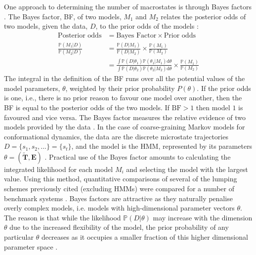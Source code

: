 One approach to determining the number of macrostates is through Bayes factors \cite{kassBayesFactors1995}. The Bayes factor, BF, of two models, $M_{1}$ and $M_{2}$ relates the posterior odds of two models, given the data, $D$, to the prior odds of the models \cite{kassBayesFactors1995}:
\begin{align}
\text{Posterior odds} & = \text{Bayes Factor} \times \text{Prior odds} \\
\frac{ \mathbb{P}(M_1|D) }{ \mathbb{P}(M_2|D) } & = \frac{ \mathbb{P}(D|M_1) }{ \mathbb{P}(D|M_2) } \times \frac{ \mathbb{P}(M_1) }{ \mathbb{P}(M_2) }\\
& = \frac{\int \mathbb{P}\left( D | \theta_{1} \right)\mathbb{P}(\theta_{1}|M_{1}) \mathrm{d}\theta}{\int \mathbb{P}\left( D | \theta_{2} \right)\mathbb{P}(\theta_{2}|M_{2}) \mathrm{d}\theta} \times \frac{\mathbb{P}(M_1)}{\mathbb{P}(M_2)}
\end{align}
The integral in the definition of the BF runs over all the potential values of the model parameters, $\theta$, weighted by their prior probability $P(\theta)$. If the prior odds is one, i.e., there is no prior reason to favour one model over another, then the BF is equal to the posterior odds of the two models. If $\textrm{BF} > 1$ then model $1$ is favoured and vice versa. The Bayes factor measures the relative evidence of two models provided by the data \cite{kassBayesFactors1995}. In the case of coarse-graining Markov models for conformational dynamics, the data are the discrete microstate trajectories $D = \{s_1, s_2, ...\}= \{s_t\}$, and the model is the HMM, represented by its parameters $\theta = (\tilde{\mathbf{T}}, \mathbf{E})$ \cite{bacalladoBayesianComparisonMarkov2009a}. Practical use of the Bayes factor amounts to calculating the integrated likelihood  for each model $M_i$ and selecting the model with the largest value. Using this method, quantitative comparisons of several of the lumping schemes previously cited  (excluding HMMs) were  compared for a number of benchmark systems \cite{bowmanQuantitativeComparisonAlternative2013}. Bayes factors are attractive as they naturally penalise overly complex models, i.e. models with high-dimensional parameter vectors $\theta$. The reason is that while the likelihood $\mathbb{P}(D|\theta)$ may increase with the dimension $\theta$ due to the increased flexibility of the model, the prior probability of any particular $\theta$ decreases as it occupies a smaller fraction of this higher dimensional parameter space \cite{kassBayesFactors1995,mackay2003information}.


